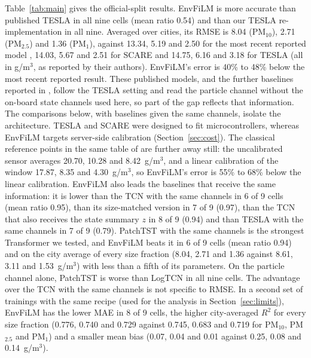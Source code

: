 \documentclass[journal]{IEEEtran}
\newcommand{\PMten}{PM$_{10}$}
\newcommand{\PMtwo}{PM$_{2.5}$}
\newcommand{\PMone}{PM$_{1}$}
\newcommand{\ugm}{\textmu g/m$^3$}
\begin{document}
Table~\ref{tab:main} gives the official-split results. EnvFiLM is more accurate than published TESLA in all nine cells
(mean ratio 0.54) and than our TESLA re-implementation in all nine. Averaged over cities, its RMSE is 8.04 (\PMten),
2.71 (\PMtwo) and 1.36 (\PMone), against 13.34, 5.19 and 2.50 for the most recent reported model \cite{yun2026},
14.03, 5.67 and 2.51 for SCARE and 14.75, 6.16 and 3.18 for TESLA (all in \ugm{}, as reported by their authors).
EnvFiLM's error is 40\% to 48\% below the most recent reported result. These published models, and the further
baselines reported in \cite{yun2026}, follow the TESLA setting and read the particle channel without the on-board state
channels used here, so part of the gap reflects that information. The comparisons below, with baselines given the
same channels, isolate the architecture. TESLA and SCARE were designed to fit microcontrollers, whereas EnvFiLM targets
server-side calibration (Section~\ref{sec:cost}). The classical reference points in the same table of
\cite{ahn2025} are further away still: the uncalibrated sensor averages 20.70, 10.28 and 8.42~\ugm{}, and a linear
calibration of the window 17.87, 8.35 and 4.30~\ugm{}, so EnvFiLM's error is 55\% to 68\% below the linear
calibration. EnvFiLM also leads the baselines that receive the same
information: it is lower than the TCN with the same channels in 6 of 9 cells (mean ratio 0.95), than its size-matched
version in 7 of 9 (0.97), than the TCN that also receives the state summary $z$ in 8 of 9 (0.94) and than TESLA
with the same channels in 7 of 9 (0.79). PatchTST with the same channels is the
strongest Transformer we tested, and EnvFiLM beats it in 6 of 9 cells (mean ratio 0.94) and on the city average of
every size fraction (8.04, 2.71 and 1.36 against 8.61, 3.11 and 1.53~\ugm{}) with less than a fifth of its parameters. On the
particle channel alone, PatchTST is worse than LogTCN in all nine cells. The advantage over the TCN with the same channels
is not specific to RMSE. In a second set of trainings with the same recipe (used for the analysis in
Section~\ref{sec:limits}), EnvFiLM has the lower MAE in 8 of 9 cells, the higher city-averaged $R^2$ for every size
fraction (0.776, 0.740 and 0.729 against 0.745, 0.683 and 0.719 for \PMten, \PMtwo{} and \PMone) and a smaller
mean bias (0.07, 0.04 and 0.01 against 0.25, 0.08 and 0.14~\ugm{}).

\begin{table}[t]
\centering
\caption{RMSE (\textup{\textmu g/m$^3$}) on the TESLA benchmark (authors' data, official split, mean of three seeds;
published TESLA from \cite{ahn2025}, one value per cell). Columns 2 to 6 receive the same four on-board state
channels as EnvFiLM. Best per row in bold.}
\label{tab:main}

\end{table}
\end{document}
